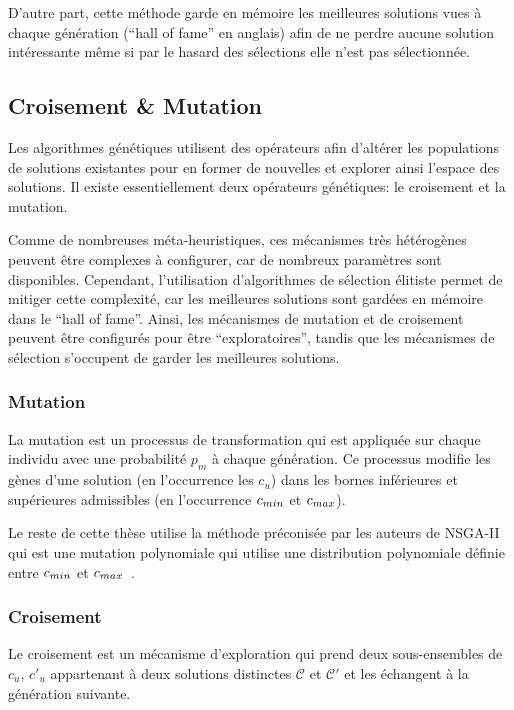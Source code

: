 D'autre part, cette méthode garde en mémoire les meilleures solutions vues à chaque génération (``hall of fame'' en anglais) afin de ne perdre aucune solution intéressante même si par le hasard des sélections elle n'est pas sélectionnée.

\subsection{Croisement \& Mutation}
\label{cache:mutation}

Les algorithmes génétiques utilisent des opérateurs afin d'altérer les populations de solutions existantes pour en former de nouvelles et explorer ainsi l'espace des solutions.
Il existe essentiellement deux opérateurs génétiques: le croisement et la mutation.

Comme de nombreuses méta-heuristiques, ces mécanismes très hétérogènes peuvent être complexes à configurer, car de nombreux paramètres sont disponibles.
Cependant, l'utilisation d'algorithmes de sélection élitiste permet de mitiger cette complexité, car les meilleures solutions sont gardées en mémoire dans le ``hall of fame''.
Ainsi, les mécanismes de mutation et de croisement peuvent être configurés pour être  ``exploratoires'', tandis que les mécanismes de sélection s'occupent de garder les meilleures solutions.

\subsubsection{Mutation}

La mutation est un processus de transformation qui est appliquée sur chaque individu avec une probabilité $p_m$ à chaque génération.
Ce processus modifie les gènes d'une solution (en l’occurrence les $c_u$) dans les bornes inférieures et supérieures admissibles (en l’occurrence $c_{min}$ et $c_{max}$).

Le reste de cette thèse utilise la méthode préconisée par les auteurs de NSGA-II qui est une mutation polynomiale qui utilise une distribution polynomiale définie entre $c_{min}$ et $c_{max}$~\cite{deb2014analysing}.

\subsubsection{Croisement}

Le croisement est un mécanisme d'exploration qui prend deux sous-ensembles de $c_u$, $c'_u$ appartenant à deux solutions distinctes $\mathcal{C}$ et $\mathcal{C}'$ et les échangent à la génération suivante.

